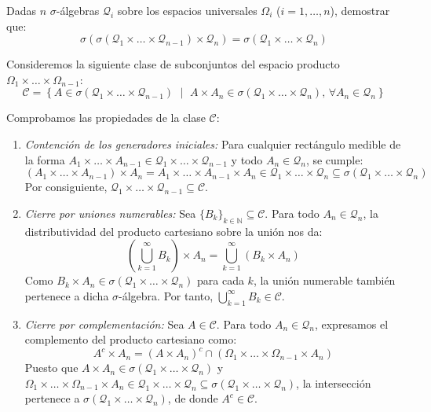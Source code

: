 \newpage
\begin{problema}
Dadas $n$ $\sigma$-álgebras $\mathcal{Q}_i$ sobre los espacios universales $\Omega_i$ ($i = 1, \dots, n$), demostrar que:
\[
    \sigma\left(\sigma(\mathcal{Q}_1 \times \dots \times \mathcal{Q}_{n-1}) \times \mathcal{Q}_n\right) = \sigma(\mathcal{Q}_1 \times \dots \times \mathcal{Q}_n)
\]

\tcblower

Consideremos la siguiente clase de subconjuntos del espacio producto $\Omega_1 \times \dots \times \Omega_{n-1}$:
\[
    \mathcal{C} = \left\{ A \in \sigma(\mathcal{Q}_1 \times \dots \times \mathcal{Q}_{n-1}) \,\,\middle|\,\, A \times A_n \in \sigma(\mathcal{Q}_1 \times \dots \times \mathcal{Q}_n), \, \forall A_n \in \mathcal{Q}_n \right\}
\]

Comprobamos las propiedades de la clase $\mathcal{C}$:

\begin{enumerate}[label=\arabic*.]
    \item \textit{Contención de los generadores iniciales:} Para cualquier rectángulo medible de la forma $A_1 \times \dots \times A_{n-1} \in \mathcal{Q}_1 \times \dots \times \mathcal{Q}_{n-1}$ y todo $A_n \in \mathcal{Q}_n$, se cumple:
    \[
        (A_1 \times \dots \times A_{n-1}) \times A_n = A_1 \times \dots \times A_{n-1} \times A_n \in \mathcal{Q}_1 \times \dots \times \mathcal{Q}_n \subseteq \sigma(\mathcal{Q}_1 \times \dots \times \mathcal{Q}_n)
    \]
    Por consiguiente, $\mathcal{Q}_1 \times \dots \times \mathcal{Q}_{n-1} \subseteq \mathcal{C}$.

    \item \textit{Cierre por uniones numerables:} Sea $\{B_k\}_{k \in \mathbb{N}} \subseteq \mathcal{C}$. Para todo $A_n \in \mathcal{Q}_n$, la distributividad del producto cartesiano sobre la unión nos da:
    \[
        \left( \bigcup_{k=1}^\infty B_k \right) \times A_n = \bigcup_{k=1}^\infty (B_k \times A_n)
    \]
    Como $B_k \times A_n \in \sigma(\mathcal{Q}_1 \times \dots \times \mathcal{Q}_n)$ para cada $k$, la unión numerable también pertenece a dicha $\sigma$-álgebra. Por tanto, $\bigcup_{k=1}^\infty B_k \in \mathcal{C}$.

    \item \textit{Cierre por complementación:} Sea $A \in \mathcal{C}$. Para todo $A_n \in \mathcal{Q}_n$, expresamos el complemento del producto cartesiano como:
    \[
        A^c \times A_n = (A \times A_n)^c \cap (\Omega_1 \times \dots \times \Omega_{n-1} \times A_n)
    \]
    Puesto que $A \times A_n \in \sigma(\mathcal{Q}_1 \times \dots \times \mathcal{Q}_n)$ y $\Omega_1 \times \dots \times \Omega_{n-1} \times A_n \in \mathcal{Q}_1 \times \dots \times \mathcal{Q}_n \subseteq \sigma(\mathcal{Q}_1 \times \dots \times \mathcal{Q}_n)$, la intersección pertenece a $\sigma(\mathcal{Q}_1 \times \dots \times \mathcal{Q}_n)$, de donde $A^c \in \mathcal{C}$.
\end{enumerate}


\end{problema}

